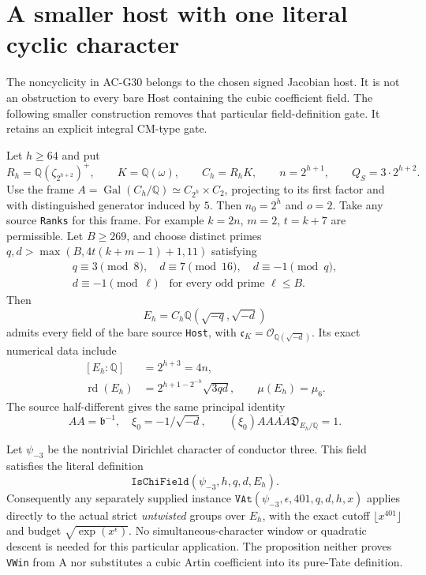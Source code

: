 \section{A smaller host with one literal cyclic character}
\label{sec:cyclic-cm-host}

The noncyclicity in AC-G30 belongs to the chosen signed
Jacobian host.  It is not an obstruction to every bare Host
containing the cubic coefficient field.  The following smaller
construction removes that particular field-definition gate.
It retains an explicit integral CM-type gate.

\begin{proposition}
\label{AC-G32}
Let $h\geq64$ and put
\[
 R_h=\mathbb Q(\zeta_{2^{h+2}})^+,
 \qquad K=\mathbb Q(\omega),\qquad C_h=R_hK,
 \qquad n=2^{h+1},\qquad Q_S=3\cdot2^{h+2}.
                                                               \tag{G32.1}
\]
Use the frame
$A=\operatorname{Gal}(C_h/\mathbb Q)\simeq C_{2^h}\times C_2$,
projecting to its first factor and with distinguished generator
induced by $5$.  Then $n_0=2^h$ and $o=2$.
Take any source \texttt{Ranks} for this frame.  For example
$k=2n$, $m=2$, $t=k+7$ are permissible.
Let $B\geq269$, and choose distinct primes
$q,d>\max(B,4t(k+m-1)+1,11)$ satisfying
\[
 \begin{gathered}
 q\equiv3\pmod8,\quad d\equiv7\pmod {16},\quad
 d\equiv-1\pmod q,\\
 d\equiv-1\pmod\ell
       \quad\text{for every odd prime }\ell\leq B.
 \end{gathered}
                                                               \tag{G32.2}
\]
Then
\[
 E_h=C_h\mathbb Q(\sqrt{-q},\sqrt{-d})
                                                               \tag{G32.3}
\]
admits every field of the bare source \texttt{Host}, with
$\mathfrak c_K=\mathcal O_{\mathbb Q(\sqrt{-d})}$.
Its exact numerical data include
\[
 \begin{split}
 [E_h:\mathbb Q]&=2^{h+3}=4n,\\
 \operatorname{rd}(E_h)
   &=2^{h+1-2^{-h}}\sqrt{3qd},\qquad
 \mu(E_h)=\mu_6.
 \end{split}                                                   \tag{G32.4}
\]
The source half-different gives the same principal identity
\[
 AA=\mathfrak b^{-1},\quad \xi_0=-1/\sqrt{-d},\qquad
        (\xi_0)AA\overline{AA}\mathfrak D_{E_h/\mathbb Q}=1.
                                                               \tag{G32.5}
\]

Let $\psi_{-3}$ be the nontrivial Dirichlet character of
conductor three.  This field satisfies the literal definition
\[
             \texttt{IsChiField}(\psi_{-3},h,q,d,E_h).
                                                               \tag{G32.6}
\]
Consequently any separately supplied instance
$\texttt{VAt}(\psi_{-3},\epsilon,401,q,d,h,x)$ applies
directly to the actual strict \emph{untwisted} groups over
$E_h$, with the exact cutoff $\lfloor x^{401}\rfloor$
and budget $\sqrt{\exp(x^\epsilon)}$.
No simultaneous-character window or quadratic descent is
needed for this particular application.  The proposition
neither proves \texttt{VWin} from A nor substitutes a
cubic Artin coefficient into its pure-Tate definition.
\end{proposition}
